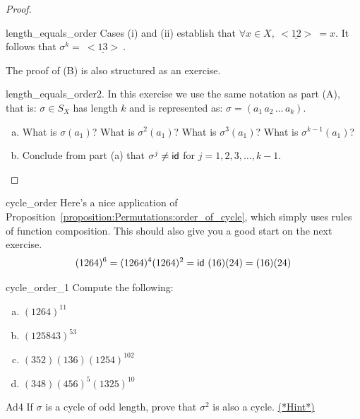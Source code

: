 \begin{proof}
\begin{exercise}{length_equals_order}
\noindent
Cases (i) and (ii) establish that  $\forall x \in X, \underline{~<12>~} = x$.  It follows that $\sigma^k = \underline{~<13>~}$.

\end{exercise}

\noindent
The proof of (B) is also structured as an exercise.

\begin{exercise}{length_equals_order2}. In this exercise we use the same notation as part (A), that is: $\sigma \in S_X$ has length $k$ and is represented as: $\sigma = (a_1 \, a_2 \, \ldots \, a_k)$. 
\begin{enumerate}[(a)]
\item
What is $\sigma(a_1)$? What is $\sigma^2(a_1)$? What is $\sigma^3(a_1)$? What is $\sigma^{k-1}(a_1)$?
\item
Conclude from part (a) that  $\sigma^j \neq {\sf{i}d} $ for $j = 1,2,3, \ldots, k-1.$
\end{enumerate}
\end{exercise}
\end{proof}

\begin{example}{cycle_order}
Here's a nice application of Proposition~\ref{proposition:Permutations:order_of_cycle}, which simply uses rules of function composition.  This should also give you a good start on the next exercise.
\[
(1 2 6 4)^6 = (1 2 6 4)^4 (1 2 6 4)^2 = {\sf{i}d} ~(1 6) (2 4) = (1 6)(2 4) \]
\end{example}

\begin{exercise}{cycle_order_1}
Compute the following:
\begin{multicols}{2}
\begin{enumerate}[(a)]
\item
$(1 2 6 4)^{11}$
\item
$(1 2 5 8 4 3)^{53}$
\item
$(3 5 2)(1 3 6)(1254)^{102}$
\item
$(3 4 8) (4 5 6)^5 (1 3 2 5)^{10}$
\end{enumerate}
\end{multicols}
\end{exercise}


\begin{exercise}{Ad4}
If $\sigma$ is a cycle of odd length, prove that $\sigma^2$ is also a
cycle.
\hyperref[sec:Permutations:Hints]{(*Hint*)}  
\end{exercise}


